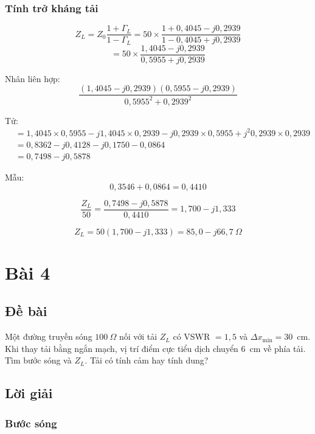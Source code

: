 \documentclass[12pt,a4paper]{article}
\begin{document}
\subsubsection{Tính trở kháng tải}

\[
Z_L = Z_0 \frac{1 + \Gamma_L}{1 - \Gamma_L} = 50 \times \frac{1 + 0{,}4045 - j0{,}2939}{1 - 0{,}4045 + j0{,}2939}
\]
\[
= 50 \times \frac{1{,}4045 - j0{,}2939}{0{,}5955 + j0{,}2939}
\]

Nhân liên hợp:
\[
\frac{(1{,}4045 - j0{,}2939)(0{,}5955 - j0{,}2939)}{0{,}5955^2 + 0{,}2939^2}
\]

Tử:
\begin{align*}
&= 1{,}4045 \times 0{,}5955 - j1{,}4045 \times 0{,}2939 - j0{,}2939 \times 0{,}5955 + j^2 0{,}2939 \times 0{,}2939 \\
&= 0{,}8362 - j0{,}4128 - j0{,}1750 - 0{,}0864 \\
&= 0{,}7498 - j0{,}5878
\end{align*}

Mẫu:
\[
0{,}3546 + 0{,}0864 = 0{,}4410
\]

\[
\frac{Z_L}{50} = \frac{0{,}7498 - j0{,}5878}{0{,}4410} = 1{,}700 - j1{,}333
\]

\[
\boxed{Z_L = 50(1{,}700 - j1{,}333) = 85{,}0 - j66{,}7~\Omega}
\]

\newpage
\section{Bài 4}

\subsection{Đề bài}
Một đường truyền sóng $100~\Omega$ nối với tải $Z_L$ có VSWR $= 1{,}5$ và $\Delta x_{\min} = 30$~cm. Khi thay tải bằng ngắn mạch, vị trí điểm cực tiểu dịch chuyển $6$~cm về phía tải. Tìm bước sóng và $Z_L$. Tải có tính cảm hay tính dung?

\subsection{Lời giải}

\subsubsection{Bước sóng}
\end{document}
